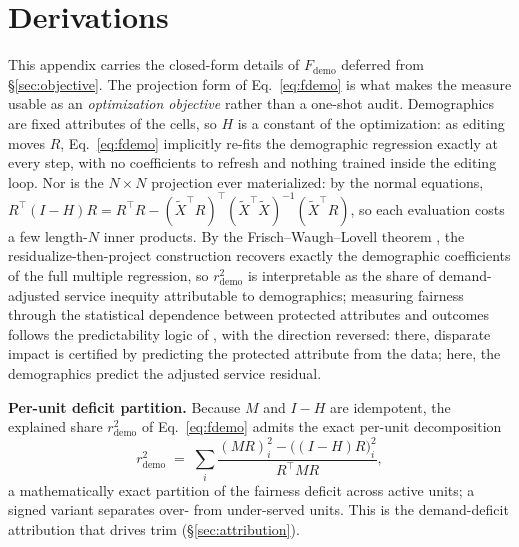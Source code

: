 \section{Derivations}\label{app:derivations}

This appendix carries the closed-form details of $F_{\mathrm{demo}}$ deferred
from \S\ref{sec:objective}. The projection form of Eq.~\eqref{eq:fdemo} is what
makes the measure usable as an \emph{optimization objective} rather than a
one-shot audit. Demographics are fixed attributes of the cells, so $H$ is a
constant of the optimization: as editing moves $R$, Eq.~\eqref{eq:fdemo}
implicitly re-fits the demographic regression exactly at every step, with no
coefficients to refresh and nothing trained inside the editing loop. Nor is the
$N \times N$ projection ever materialized: by the normal equations,
$R^{\top}(I-H)R = R^{\top}R -
(\tilde{X}^{\top}R)^{\top}(\tilde{X}^{\top}\tilde{X})^{-1}(\tilde{X}^{\top}R)$,
so each evaluation costs a few length-$N$ inner products.
By the Frisch--Waugh--Lovell theorem \cite{frischwaugh1933,lovell1963}, the
residualize-then-project construction recovers exactly the demographic
coefficients of the full multiple regression, so $r^{2}_{\mathrm{demo}}$ is
interpretable as the share of demand-adjusted service inequity attributable to
demographics; measuring fairness through the statistical dependence between
protected attributes and outcomes follows the predictability logic of
\cite{feldman2015}, with the direction reversed: there, disparate impact is
certified by predicting the protected attribute from the data; here, the
demographics predict the adjusted service residual.

\textbf{Per-unit deficit partition.} Because $M$ and $I-H$ are idempotent,
the explained share $r^{2}_{\mathrm{demo}}$ of Eq.~\eqref{eq:fdemo} admits
the exact per-unit decomposition
\begin{equation}\label{eq:unit-attr}
r^{2}_{\mathrm{demo}}
\;=\; \sum_i \frac{(MR)_i^{2} - \bigl((I-H)R\bigr)_i^{2}}{R^{\top}MR},
\end{equation}
a mathematically exact partition of the fairness deficit across active
units; a signed variant separates over- from under-served units. This is
the demand-deficit attribution that drives trim (\S\ref{sec:attribution}).

